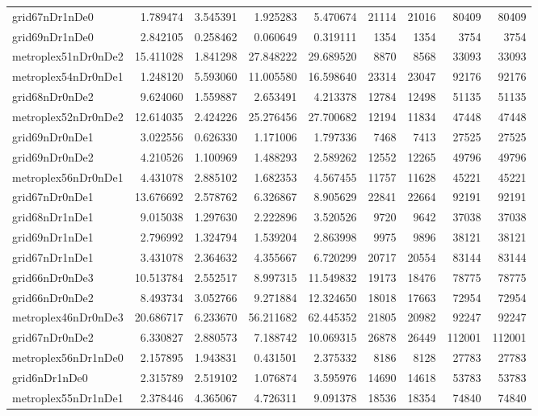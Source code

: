 \begin{longtable}{|l|r|r|r|r|r|r|r|r|}
grid67nDr1nDe0 & 1.789474 & 3.545391 & 1.925283 & 5.470674 & 21114 & 21016 & 80409 & 80409 \\
grid69nDr1nDe0 & 2.842105 & 0.258462 & 0.060649 & 0.319111 & 1354 & 1354 & 3754 & 3754 \\
metroplex51nDr0nDe2 & 15.411028 & 1.841298 & 27.848222 & 29.689520 & 8870 & 8568 & 33093 & 33093 \\
metroplex54nDr0nDe1 & 1.248120 & 5.593060 & 11.005580 & 16.598640 & 23314 & 23047 & 92176 & 92176 \\
grid68nDr0nDe2 & 9.624060 & 1.559887 & 2.653491 & 4.213378 & 12784 & 12498 & 51135 & 51135 \\
metroplex52nDr0nDe2 & 12.614035 & 2.424226 & 25.276456 & 27.700682 & 12194 & 11834 & 47448 & 47448 \\
grid69nDr0nDe1 & 3.022556 & 0.626330 & 1.171006 & 1.797336 & 7468 & 7413 & 27525 & 27525 \\
grid69nDr0nDe2 & 4.210526 & 1.100969 & 1.488293 & 2.589262 & 12552 & 12265 & 49796 & 49796 \\
metroplex56nDr0nDe1 & 4.431078 & 2.885102 & 1.682353 & 4.567455 & 11757 & 11628 & 45221 & 45221 \\
grid67nDr0nDe1 & 13.676692 & 2.578762 & 6.326867 & 8.905629 & 22841 & 22664 & 92191 & 92191 \\
grid68nDr1nDe1 & 9.015038 & 1.297630 & 2.222896 & 3.520526 & 9720 & 9642 & 37038 & 37038 \\
grid69nDr1nDe1 & 2.796992 & 1.324794 & 1.539204 & 2.863998 & 9975 & 9896 & 38121 & 38121 \\
grid67nDr1nDe1 & 3.431078 & 2.364632 & 4.355667 & 6.720299 & 20717 & 20554 & 83144 & 83144 \\
grid66nDr0nDe3 & 10.513784 & 2.552517 & 8.997315 & 11.549832 & 19173 & 18476 & 78775 & 78775 \\
grid66nDr0nDe2 & 8.493734 & 3.052766 & 9.271884 & 12.324650 & 18018 & 17663 & 72954 & 72954 \\
metroplex46nDr0nDe3 & 20.686717 & 6.233670 & 56.211682 & 62.445352 & 21805 & 20982 & 92247 & 92247 \\
grid67nDr0nDe2 & 6.330827 & 2.880573 & 7.188742 & 10.069315 & 26878 & 26449 & 112001 & 112001 \\
metroplex56nDr1nDe0 & 2.157895 & 1.943831 & 0.431501 & 2.375332 & 8186 & 8128 & 27783 & 27783 \\
grid6nDr1nDe0 & 2.315789 & 2.519102 & 1.076874 & 3.595976 & 14690 & 14618 & 53783 & 53783 \\
metroplex55nDr1nDe1 & 2.378446 & 4.365067 & 4.726311 & 9.091378 & 18536 & 18354 & 74840 & 74840 \\

\end{longtable}
